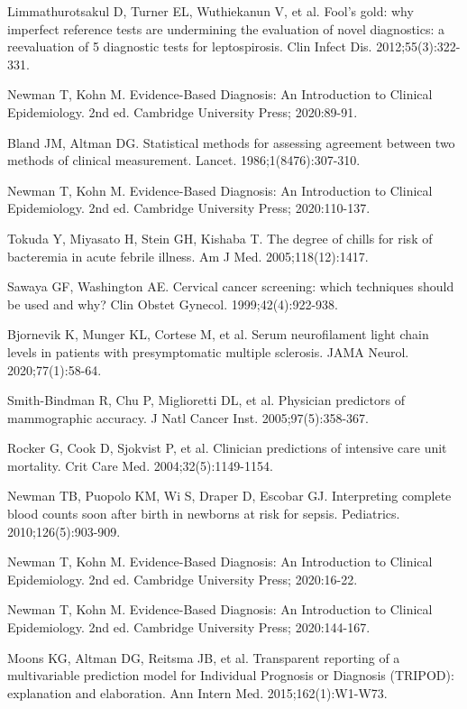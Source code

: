 \begin{references}
\item Limmathurotsakul D, Turner EL, Wuthiekanun V, et al. Fool’s gold: why imperfect reference tests are undermining the evaluation of novel diagnostics: a reevaluation of 5 diagnostic tests for leptospirosis. Clin Infect Dis. 2012;55(3):322-331.
\item Newman T, Kohn M. Evidence-Based Diagnosis: An Introduction to Clinical Epidemiology. 2nd ed. Cambridge University Press; 2020:89-91.
\item Bland JM, Altman DG. Statistical methods for assessing agreement between two methods of clinical measurement. Lancet. 1986;1(8476):307-310.
\item Newman T, Kohn M. Evidence-Based Diagnosis: An Introduction to Clinical Epidemiology. 2nd ed. Cambridge University Press; 2020:110-137.
\item Tokuda Y, Miyasato H, Stein GH, Kishaba T. The degree of chills for risk of bacteremia in acute febrile illness. Am J Med. 2005;118(12):1417.
\item Sawaya GF, Washington AE. Cervical cancer screening: which techniques should be used and why? Clin Obstet Gynecol. 1999;42(4):922-938.
\item Bjornevik K, Munger KL, Cortese M, et al. Serum neurofilament light chain levels in patients with presymptomatic multiple sclerosis. JAMA Neurol. 2020;77(1):58-64.
\item Smith-Bindman R, Chu P, Miglioretti DL, et al. Physician predictors of mammographic accuracy. J Natl Cancer Inst. 2005;97(5):358-367.
\item Rocker G, Cook D, Sjokvist P, et al. Clinician predictions of intensive care unit mortality. Crit Care Med. 2004;32(5):1149-1154.
\item Newman TB, Puopolo KM, Wi S, Draper D, Escobar GJ. Interpreting complete blood counts soon after birth in newborns at risk for sepsis. Pediatrics. 2010;126(5):903-909.
\item Newman T, Kohn M. Evidence-Based Diagnosis: An Introduction to Clinical Epidemiology. 2nd ed. Cambridge University Press; 2020:16-22.
\item Newman T, Kohn M. Evidence-Based Diagnosis: An Introduction to Clinical Epidemiology. 2nd ed. Cambridge University Press; 2020:144-167.
\item Moons KG, Altman DG, Reitsma JB, et al. Transparent reporting of a multivariable prediction model for Individual Prognosis or Diagnosis (TRIPOD): explanation and elaboration. Ann Intern Med. 2015;162(1):W1-W73.

\end{references}
